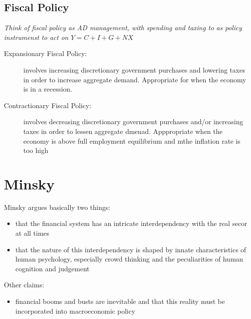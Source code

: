 \documentclass{article}
\begin{document}
\subsection{Fiscal Policy}
\label{sec:fiscpol}
\textit{Think of fiscal policy as AD management, with spending and taxing to as policy instrumenst to act on $Y = C+I+G+NX$}

\begin{description}
\item[Expansionary Fiscal Policy:] involves increasing discretionary government purchases and lowering taxes in order to increase aggregate demand. Appropriate for when the economy is in a recession.
\item[Contractionary Fiscal Policy:] involves decreasing discretionary government purchases and/or increasing taxes in order to lessen aggregate dmenad. Apppropriate when the economy is above full employment equilibrium and  mthe inflation rate is too high
\end{description}

\section{Minsky}
\label{sec:minsk}
Minsky argues basically two things:
\begin{itemize}
\item that the financial system has an intricate interdependency with the real secor at all times
\item that the nature of this interdependency is shaped by innate characteristics of human psychology, especially crowd thinking and the peculiarities of human cognition and judgement\\
\end{itemize}
Other claims:
\begin{itemize}
\item financial booms and busts are inevitable and that this reality must be incorporated into macroeconomic policy
\end{itemize}
\end{document}
